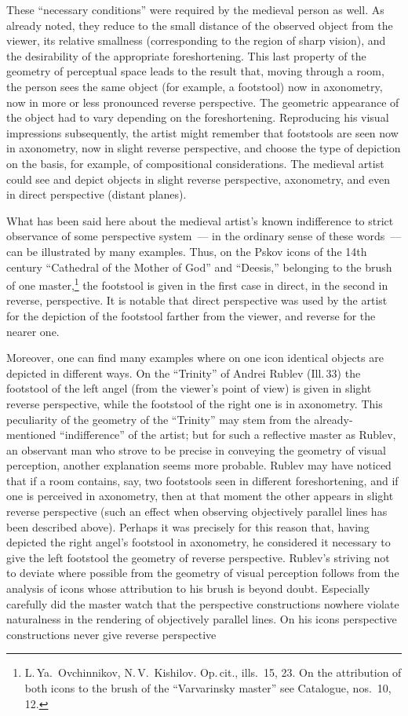 These ``necessary conditions'' were required by the medieval person as well.  As
already noted, they reduce to the small distance of the observed object from the
viewer, its relative smallness (corresponding to the region of sharp vision), and the
desirability of the appropriate foreshortening.  This last property of the geometry
of perceptual space leads to the result that, moving through a room, the person sees
the same object (for example, a footstool) now in axonometry, now in more or less
pronounced reverse perspective.  The geometric appearance of the object had to vary
depending on the foreshortening.  Reproducing his visual impressions subsequently,
the artist might remember that footstools are seen now in axonometry, now in slight
reverse perspective, and choose the type of depiction on the basis, for example, of
compositional considerations.  The medieval artist could see and depict objects in
slight reverse perspective, axonometry, and even in direct perspective (distant
planes).

What has been said here about the medieval artist's known indifference to strict
observance of some perspective system~--- in the ordinary sense of these words~--- can
be illustrated by many examples.  Thus, on the Pskov icons of the 14th century
``Cathedral of the Mother of God'' and ``Deesis,'' belonging to the brush of one
master,\footnote{L.\,Ya.~Ovchinnikov, N.\,V.~Kishilov.  Op.\,cit., ills.~15, 23.
  On the attribution of both icons to the brush of the ``Varvarinsky master'' see
  Catalogue, nos.~10, 12.}
the footstool is given in the first case in direct, in the second in reverse,
perspective.  It is notable that direct perspective was used by the artist for the
depiction of the footstool farther from the viewer, and reverse for the nearer one.

Moreover, one can find many examples where on one icon identical objects are depicted
in different ways.  On the ``Trinity'' of Andrei Rublev (Ill.\,33) the footstool of
the left angel (from the viewer's point of view) is given in slight reverse
perspective, while the footstool of the right one is in axonometry.  This peculiarity
of the geometry of the ``Trinity'' may stem from the already-mentioned
``indifference'' of the artist; but for such a reflective master as Rublev, an
observant man who strove to be precise in conveying the geometry of visual
perception, another explanation seems more probable.  Rublev may have noticed that
if a room contains, say, two footstools seen in different foreshortening, and if one
is perceived in axonometry, then at that moment the other appears in slight reverse
perspective (such an effect when observing objectively parallel lines has been
described above).  Perhaps it was precisely for this reason that, having depicted the
right angel's footstool in axonometry, he considered it necessary to give the left
footstool the geometry of reverse perspective.  Rublev's striving not to deviate
where possible from the geometry of visual perception follows from the analysis of
icons whose attribution to his brush is beyond doubt.  Especially carefully did the
master watch that the perspective constructions nowhere violate naturalness in the
rendering of objectively parallel lines.  On his icons perspective constructions
never give reverse perspective


